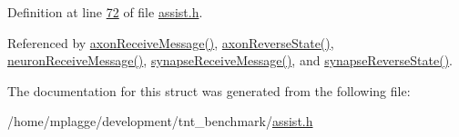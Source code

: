 Definition at line \hyperlink{assist_8h_source_l00072}{72} of file \hyperlink{assist_8h_source}{assist.\+h}.



Referenced by \hyperlink{axon_8c_source_l00011}{axon\+Receive\+Message()}, \hyperlink{axon_8c_source_l00029}{axon\+Reverse\+State()}, \hyperlink{neuron_8c_source_l00103}{neuron\+Receive\+Message()}, \hyperlink{synapse_8c_source_l00011}{synapse\+Receive\+Message()}, and \hyperlink{synapse_8c_source_l00040}{synapse\+Reverse\+State()}.



The documentation for this struct was generated from the following file\+:\begin{DoxyCompactItemize}
\item 
/home/mplagge/development/tnt\+\_\+benchmark/\hyperlink{assist_8h}{assist.\+h}\end{DoxyCompactItemize}
